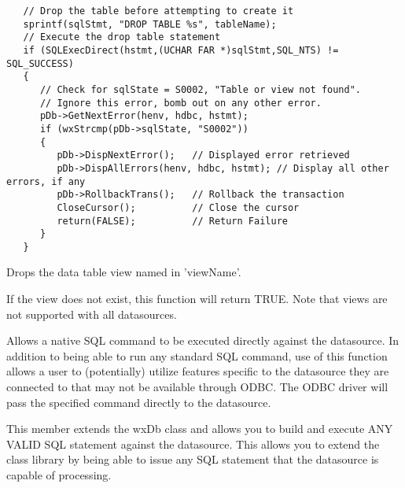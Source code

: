 
\begin{verbatim}
   // Drop the table before attempting to create it
   sprintf(sqlStmt, "DROP TABLE %s", tableName);
   // Execute the drop table statement
   if (SQLExecDirect(hstmt,(UCHAR FAR *)sqlStmt,SQL_NTS) != SQL_SUCCESS)
   {
      // Check for sqlState = S0002, "Table or view not found".
      // Ignore this error, bomb out on any other error.
      pDb->GetNextError(henv, hdbc, hstmt);
      if (wxStrcmp(pDb->sqlState, "S0002"))
      {
         pDb->DispNextError();   // Displayed error retrieved
         pDb->DispAllErrors(henv, hdbc, hstmt); // Display all other errors, if any
         pDb->RollbackTrans();   // Rollback the transaction
         CloseCursor();          // Close the cursor
         return(FALSE);          // Return Failure
      }
   }
\end{verbatim}


\label{wxdbdropview}


Drops the data table view named in 'viewName'.




If the view does not exist, this function will return TRUE.  Note that views are not supported with all datasources.

\label{wxdbexecsql}


Allows a native SQL command to be executed directly against the datasource.  In addition to being able to run any standard SQL command, use of this function allows a user to (potentially) utilize features specific to the datasource they are connected to that may not be available through ODBC.  The ODBC driver will pass the specified command directly to the datasource.




This member extends the wxDb class and allows you to build and execute ANY VALID
SQL statement against the datasource.  This allows you to extend the class
library by being able to issue any SQL statement that the datasource is capable
of processing.

